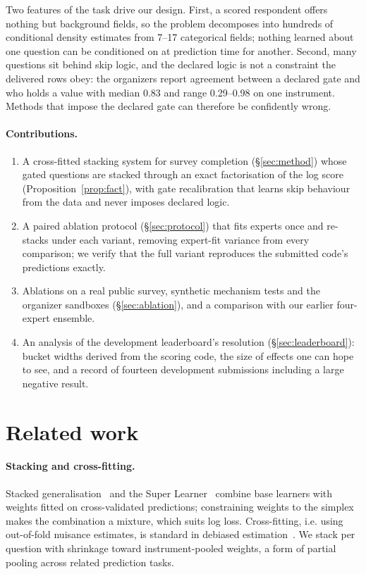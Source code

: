 \documentclass[10pt]{article}
\begin{document}
Two features of the task drive our design. First, a scored respondent offers nothing but background fields, so the problem decomposes into hundreds of conditional density estimates from 7--17 categorical fields; nothing learned about one question can be conditioned on at prediction time for another. Second, many questions sit behind skip logic, and the declared logic is not a constraint the delivered rows obey: the organizers report agreement between a declared gate and who holds a value with median 0.83 and range 0.29--0.98 on one instrument. Methods that impose the declared gate can therefore be confidently wrong.

\paragraph{Contributions.}
\begin{enumerate}[leftmargin=*,itemsep=2pt]
\item A cross-fitted stacking system for survey completion (\S\ref{sec:method}) whose gated questions are stacked through an exact factorisation of the log score (Proposition~\ref{prop:fact}), with gate recalibration that learns skip behaviour from the data and never imposes declared logic.
\item A paired ablation protocol (\S\ref{sec:protocol}) that fits experts once and re-stacks under each variant, removing expert-fit variance from every comparison; we verify that the full variant reproduces the submitted code's predictions exactly.
\item Ablations on a real public survey, synthetic mechanism tests and the organizer sandboxes (\S\ref{sec:ablation}), and a comparison with our earlier four-expert ensemble.
\item An analysis of the development leaderboard's resolution (\S\ref{sec:leaderboard}): bucket widths derived from the scoring code, the size of effects one can hope to see, and a record of fourteen development submissions including a large negative result.
\end{enumerate}

\section{Related work}
\label{sec:related}

\paragraph{Stacking and cross-fitting.} Stacked generalisation~\citep{wolpert1992stacked,breiman1996stacked} and the Super Learner~\citep{vanderlaan2007super} combine base learners with weights fitted on cross-validated predictions; constraining weights to the simplex makes the combination a mixture, which suits log loss. Cross-fitting, i.e. using out-of-fold nuisance estimates, is standard in debiased estimation~\citep{chernozhukov2018double}. We stack per question with shrinkage toward instrument-pooled weights, a form of partial pooling across related prediction tasks.
\end{document}
